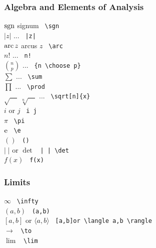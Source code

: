 \subsubsection{Algebra and Elements of Analysis}
\begin{tabbing}
\mySymbols
 $ \mathrm{sgn} $                            \> signum              \>  \verb` \sgn ` \\
 $ |z|$                              \> ...                 \>  \verb` |z| ` \\
 $ \mathrm{arc}\,z$                          \> arcus $z$           \>  \verb` \arc ` \\
 $ n!$                               \> ...                 \>  \verb` n! ` \\
 $ {n \choose p}$                    \> ...                 \>  \verb` {n \choose p} ` \\
 $ \sum $                            \> ...                 \>  \verb` \sum  ` \\
 $ \prod $                           \> ...                 \>  \verb` \prod ` \\
 $ \sqrt{\quad}\;\sqrt[n]{\quad} $   \> ...                 \>  \verb` \sqrt[n]{x} ` \\
 $i$ or $j$                          \>                     \>  \verb` i j ` \\
 $\pi $                              \>                     \>  \verb` \pi ` \\
 $\mathrm{e} $                               \>                     \>  \verb` \e ` \\
 $()$                                \>                     \>  \verb` () ` \\
 $|\;|$ or $\det$                    \>                     \>  \verb` | | \det` \\
 $f(x)$                              \>                     \>  \verb` f(x) ` \\
\end{tabbing}

\subsubsection{Limits}
\begin{tabbing}
\mySymbols
 $\infty$                            \>                                        \> \verb` \infty `  \\
 $(a,b)$                             \>                                        \> \verb` (a,b) `  \\
 ${[a,b]}$ or $\langle a,b \rangle$  \>                                        \> \verb` [a,b]or \langle a,b \rangle `  \\
 $\to $                              \>                                        \> \verb` \to  `  \\
 $\lim $                             \>                                        \> \verb` \lim `  \\
\end{tabbing}

